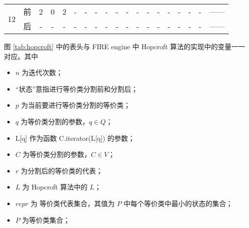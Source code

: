 \begin{table}[!htbp]
\begin{tabular}{ccccccc|cccccccccc|cl}
        \multirow{2}{*}{12}& 前 & 2 & 0 & 2 & - & -  & - & - & - & - & - & - & - & - & - & - & -             & ------ \\
                           & 后 & - & - & - & - & -  & - & - & - & - & - & - & - & - & - & - & -             & ------ \\
        \bottomrule%
    \end{tabular}
\end{table}

图 \ref{tab:hopcroft} 中的表头与 FIRE engine 中 Hopcroft 算法的实现中的变量一一对应。其中
\begin{itemize}
    \item $n$ 为迭代次数；
    \item “状态”意指进行等价类分割前和分割后；
    \item $p$ 为当前要进行等价类分割的等价类；
    \item $q$ 为等价类分割的参数，$q \in Q$；
    \item L[q] 作为函数 C.iterator(L[q]) 的参数；
    \item $C$ 为等价类分割的参数，$C \in V$；
    \item $r$ 为分割后的等价类的代表；
    \item $L$ 为 Hopcroft 算法中的 $L$；
    \item $repr$ 为 等价类代表集合，其值为 $P$ 中每个等价类中最小的状态的集合；
    \item $P$ 为等价类集合；
\end{itemize}